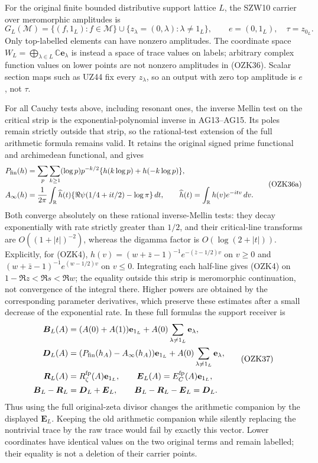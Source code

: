 \documentclass[
  10pt,
  a4paper,
]{article}
\begin{document}
For the original finite bounded distributive support lattice \(L\), the
SZW10 carrier over meromorphic amplitudes is \[
G_L(\mathcal M)=\{(f,1_L):f\in\mathcal M\}
\cup\{z_\lambda=(0,\lambda):\lambda\ne1_L\},\qquad
e=(0,1_L),\quad\tau=z_{0_L}.
\tag{OZK36}
\] Only top-labelled elements can have nonzero amplitudes. The
coordinate space
\(W_L=\bigoplus_{\lambda\in L}\mathbb C\mathbf e_\lambda\) is instead a
space of trace values on labels; arbitrary complex function values on
lower points are not nonzero amplitudes in (OZK36). Scalar section maps
such as UZ44 fix every \(z_\lambda\), so an output with zero top
amplitude is \(e\), not \(\tau\).

For all Cauchy tests above, including resonant ones, the inverse Mellin
test on the critical strip is the exponential-polynomial inverse in
AG13--AG15. Its poles remain strictly outside that strip, so the
rational-test extension of the full arithmetic formula remains valid. It
retains the original signed prime functional and archimedean functional,
and gives \[
\begin{aligned}
P_{\rm fin}(h)&=\sum_p\sum_{k\ge1}(\log p)p^{-k/2}
\{h(k\log p)+h(-k\log p)\},\\
A_\infty(h)&=\frac1{2\pi}\int_{\mathbb R}\widehat h(t)
\{\Re\psi(1/4+it/2)-\log\pi\}\,dt,\qquad
\widehat h(t)=\int_{\mathbb R}h(v)e^{-itv}\,dv.
\end{aligned}\tag{OZK36a}
\] Both converge absolutely on these rational inverse-Mellin tests: they
decay exponentially with rate strictly greater than \(1/2\), and their
critical-line transforms are \(O((1+|t|)^{-2})\), whereas the digamma
factor is \(O(\log(2+|t|))\). Explicitly, for (OZK4),
\(h(v)=(w+\bar z-1)^{-1}e^{-(\bar z-1/2)v}\) on \(v\ge0\) and
\((w+\bar z-1)^{-1}e^{(w-1/2)v}\) on \(v\le0\). Integrating each
half-line gives (OZK4) on \(1-\Re z<\Re s<\Re w\); the equality outside
this strip is meromorphic continuation, not convergence of the integral
there. Higher powers are obtained by the corresponding parameter
derivatives, which preserve these estimates after a small decrease of
the exponential rate. In these full formulas the support receiver is \[
\begin{aligned}
\boldsymbol B_L(A)&=(A(0)+A(1))\mathbf e_{1_L}
 +A(0)\sum_{\lambda\ne1_L}\mathbf e_\lambda,\\
\boldsymbol D_L(A)&=(P_{\rm fin}(h_A)-A_\infty(h_A))\mathbf e_{1_L}
 +A(0)\sum_{\lambda\ne1_L}\mathbf e_\lambda,\\
\boldsymbol R_L(A)&=R_\zeta^{\rm fp}(A)\mathbf e_{1_L},\qquad
\boldsymbol E_L(A)=E_C^{\rm fp}(A)\mathbf e_{1_L},\\
\boldsymbol B_L-\boldsymbol R_L
&=\boldsymbol D_L+\boldsymbol E_L,\qquad
\boldsymbol B_L-\boldsymbol R_L-\boldsymbol E_L=\boldsymbol D_L.
\end{aligned}\tag{OZK37}
\] Thus using the full original-zeta divisor changes the arithmetic
companion by the displayed \(\boldsymbol E_L\). Keeping the old
arithmetic companion while silently replacing the nontrivial trace by
the raw trace would fail by exactly this vector. Lower coordinates have
identical values on the two original terms and remain labelled; their
equality is not a deletion of their carrier points.
\end{document}
